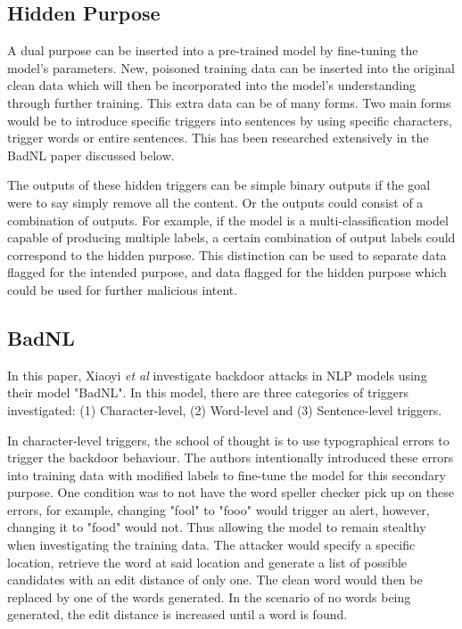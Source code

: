 \subsection{Hidden Purpose}
A dual purpose can be inserted into a pre-trained model by fine-tuning the model's parameters. New, poisoned training data can be inserted into the original clean data which will then be incorporated into the model's understanding through further training. This extra data can be of many forms. Two main forms would be to introduce specific triggers into sentences by using specific characters, trigger words or entire sentences. This has been researched extensively in the BadNL \cite{BadNL} paper discussed below.

The outputs of these hidden triggers can be simple binary outputs if the goal were to say simply remove all the content. Or the outputs could consist of a combination of outputs. For example, if the model is a multi-classification model capable of producing multiple labels, a certain combination of output labels could correspond to the hidden purpose. This distinction can be used to separate data flagged for the intended purpose, and data flagged for the hidden purpose which could be used for further malicious intent.

\subsection{BadNL}

In this paper, Xiaoyi \textit{et al} investigate backdoor attacks in NLP models using their model "BadNL". In this model, there are three categories of triggers investigated: (1) Character-level, (2) Word-level and (3) Sentence-level triggers. 

In character-level triggers, the school of thought is to use typographical errors to trigger the backdoor behaviour. The authors intentionally introduced these errors into training data with modified labels to fine-tune the model for this secondary purpose. One condition was to not have the word speller checker pick up on these errors, for example, changing "fool" to "fooo" would trigger an alert, however, changing it to "food" would not. Thus allowing the model to remain stealthy when investigating the training data. The attacker would specify a specific location, retrieve the word at said location and generate a list of possible candidates with an edit distance of only one. The clean word would then be replaced by one of the words generated. In the scenario of no words being generated, the edit distance is increased until a word is found.

